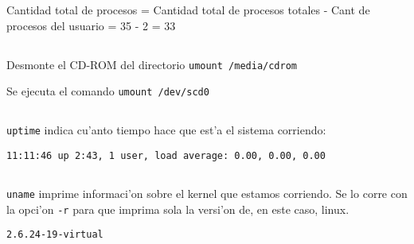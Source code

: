 Cantidad total de procesos = Cantidad total de procesos totales - Cant de procesos del usuario =  35 - 2 = 33

\subsection{}
Desmonte el CD-ROM del directorio \texttt{umount /media/cdrom}

Se ejecuta el comando \texttt{umount /dev/scd0}

\subsection{}
\texttt{uptime} indica cu'anto tiempo hace que est'a el sistema corriendo:

\texttt{11:11:46 up  2:43,   1 user,   load average: 0.00, 0.00, 0.00}

\subsection{}
\texttt{uname} imprime informaci'on sobre el kernel que estamos corriendo. Se lo corre con la opci'on \texttt{-r} para que imprima sola la versi'on de, en este caso, linux.

\texttt{2.6.24-19-virtual}
